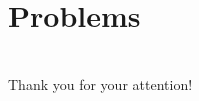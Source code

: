 \documentclass{beamer}
\begin{document}
\section{Problems}

\begin{frame}
\end{frame}

\section*{}

\begin{frame}[fragile]
  \begin{center}
    Thank you for your attention!
  \end{center}
\end{frame}
\end{document}
